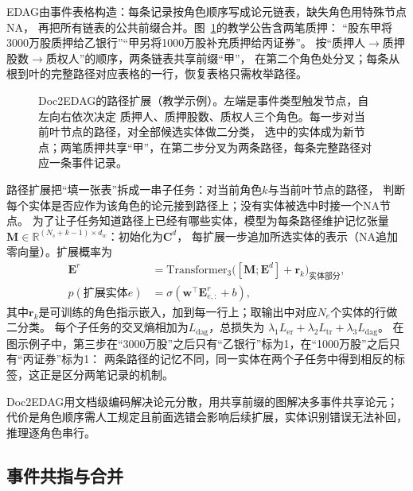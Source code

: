 EDAG由事件表格构造：每条记录按角色顺序写成论元链表，缺失角色用特殊节点NA，
再把所有链表的公共前缀合并。图~\ref{fig:nlp-extraction-doc2edag}的教学公告含两笔质押：
“股东甲将3000万股质押给乙银行”“甲另将1000万股补充质押给丙证券”。
按“质押人$\to$质押股数$\to$质权人”的顺序，两条链表共享前缀“甲”，
在第二个角色处分叉；每条从根到叶的完整路径对应表格的一行，恢复表格只需枚举路径。

\begin{figure}[htbp]
  \centering
  
  \caption{Doc2EDAG的路径扩展（教学示例）。左端是事件类型触发节点，自左向右依次决定
  质押人、质押股数、质权人三个角色。每一步对当前叶节点的路径，对全部候选实体做二分类，
  选中的实体成为新节点；两笔质押共享“甲”，在第二步分叉为两条路径，每条完整路径对应一条事件记录。}
  \label{fig:nlp-extraction-doc2edag}
\end{figure}

路径扩展把“填一张表”拆成一串子任务：对当前角色$k$与当前叶节点的路径，
判断每个实体是否应作为该角色的论元接到路径上；没有实体被选中时接一个NA节点。
为了让子任务知道路径上已经有哪些实体，模型为每条路径维护记忆张量
$\bm{M}\in\mathbb{R}^{(N_s+k-1)\times d_w}$：初始化为$\bm{C}^{d}$，
每扩展一步追加所选实体的表示（NA追加零向量）。扩展概率为
\begin{equation}
  \begin{aligned}
  \bm{E}^{r}&=\mathrm{Transformer}_3\bigl([\bm{M};\bm{E}^{d}]+\bm{r}_k\bigr)_{\text{实体部分}},\\
  p(\text{扩展实体}e)&=\sigma(\bm{w}^{\top}\bm{E}^{r}_{e,:}+b),
  \end{aligned}
  \label{eq:nlp-extraction-doc2edag-expand}
\end{equation}
其中$\bm{r}_k$是可训练的角色指示嵌入，加到每一行上；取输出中对应$N_e$个实体的行做二分类。
每个子任务的交叉熵相加为$L_{\mathrm{dag}}$，总损失为
$\lambda_1L_{\mathrm{er}}+\lambda_2L_{\mathrm{tr}}+\lambda_3L_{\mathrm{dag}}$。
在图示例子中，第三步在“3000万股”之后只有“乙银行”标为1，在“1000万股”之后只有“丙证券”标为1：
两条路径的记忆不同，同一实体在两个子任务中得到相反的标签，这正是区分两笔记录的机制。

Doc2EDAG用文档级编码解决论元分散，用共享前缀的图解决多事件共享论元；
代价是角色顺序需人工规定且前面选错会影响后续扩展，实体识别错误无法补回，推理逐角色串行。

\subsection{事件共指与合并}
\label{sec:nlp-extraction-event-coreference}

